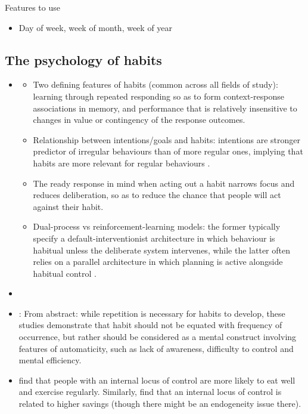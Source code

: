 \documentclass[a4paper, 11pt]{report}
\begin{document}
Features to use
\begin{itemize}

    \item Day of week, week of month, week of year

\end{itemize}


\subsection{The psychology of habits} %
\label{sub:the_psychology_of_habits}

\begin{itemize}

	\item \citet{wood2016psychology}
	\begin{itemize}
		\item Two defining features of habits (common across all fields of study): learning through repeated responding so as to form context-response associations in memory, and performance that is relatively insensitive to changes in value or contingency of the response outcomes.

		\item Relationship between intentions/goals and habits: intentions are stronger predictor of irregular behaviours than of more regular ones, implying that habits are more relevant for regular behaviours \citet{ouellette1998habit}.

		\item The ready response in mind when acting out a habit narrows focus and reduces deliberation, so as to reduce the chance that people will act against their habit.

		\item Dual-process vs reinforcement-learning models: the former typically specify a default-interventionist architecture in which behaviour is habitual unless the deliberate system intervenes, while the latter often relies on a parallel architecture in which planning is active alongside habitual control \citep{evans2013dual}.
	\end{itemize}

	\item \citet{wood2009habitual}

	\item \citet{verplanken2006beyond}: From abstract: while repetition is necessary for habits to develop, these studies demonstrate that habit should not be equated with frequency of occurrence, but rather should be considered as a mental construct involving features of automaticity, such as lack of awareness, difficulty to control and mental efficiency.

	\item \citet{cobb2014healthy} find that people with an internal locus of control are more likely to eat well and exercise regularly. Similarly, \citet{cobb2016locus} find that an internal locus of control is related to higher savings (though there might be an endogeneity issue there).
\end{itemize}
\end{document}
